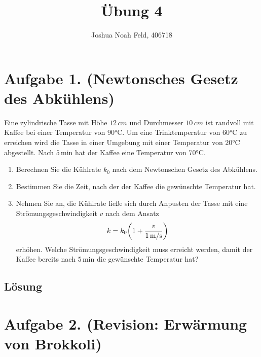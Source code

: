 \documentclass[german,12pt]{homework}
\title{Übung 4}
\author{Joshua Noah Feld, 406718}
\institute{RWTH Aachen University\\Aachener Verfahrenstechnik}
\DeclarePairedDelimiter{\enbrace}{(}{)}
\begin{document}
    \maketitle

    \section*{Aufgabe 1. (Newtonsches Gesetz des Abkühlens)}

    \begin{problem}
        Eine zylindrische Tasse mit Höhe \(12\,\si{cm}\) und Durchmesser
        \(10\,\si{cm}\) ist randvoll mit Kaffee bei einer Temperatur von
        \(90\si{\degreeCelsius}\). Um eine Trinktemperatur von
        \(60\si{\degreeCelsius}\) zu erreichen wird die Tasse in einer Umgebung
        mit einer Temperatur von \(20\si{\degreeCelsius}\) abgestellt. Nach
        \(5\,\si{\minute}\) hat der Kaffee eine Temperatur von
        \(70\si{\degreeCelsius}\).
        \begin{enumerate}
            \item Berechnen Sie die Kühlrate \(k_0\) nach dem Newtonschen
            Gesetz des Abkühlens.
            \item Bestimmen Sie die Zeit, nach der der Kaffee die gewünschte
            Temperatur hat.
            \item Nehmen Sie an, die Kühlrate ließe sich durch Anpusten der
            Tasse mit eine Strömungsgeschwindigkeit \(v\) nach dem Ansatz
            \[k = k_0\enbrace*{1 + \frac{v}{1\,\si{\metre\per{\second}}}}\]
            erhöhen. Welche Strömungsgeschwindigkeit muss erreicht werden,
            damit der Kaffee bereits nach \(5\,\si{\minute}\) die gewünschte
            Temperatur hat?
        \end{enumerate}
    \end{problem}

    \subsection*{Lösung}

    \section*{Aufgabe 2. (Revision: Erwärmung von Brokkoli)}
\end{document}
